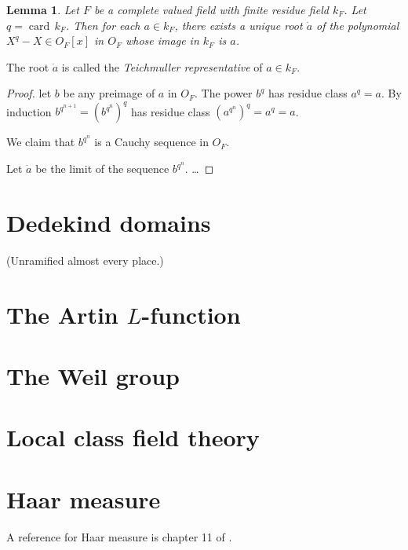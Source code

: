 \documentclass{amsart}
\def\op#1{{\operatorname{#1}}}
\newtheorem{lemma}[equation]{Lemma}
\def\newterm#1{{\it #1}}
\def\card#1{\op{card}{#1}}
\begin{document}
\begin{lemma}  Let $F$ be a complete valued field with finite residue field $k_F$.
Let $q = \card\,k_F$.  Then for each $a\in k_F$, there exists a unique root $\dot a$ of
the polynomial $X^q-X\in O_F[x]$ in $O_F$ whose image in $k_F$ is $a$.
\end{lemma}

The root $\dot a$ is called the \newterm{Teichmuller representative} of $a\in k_F$.

\begin{proof} let $b$ be any preimage of $a$ in $O_F$.  The power $b^q$ has residue class
 $a^q=a$.  By induction $b^{q^{n+1}}=(b^{q^n})^q$ has residue class $(a^{q^n})^q = a^q = a$.

We claim that $b^{q^n}$ is a Cauchy sequence in $O_F$.

Let $\dot a$ be the limit of the sequence $b^{q^n}$.  
\dots
\end{proof}

\newpage

\section{Dedekind domains}



(Unramified almost every place.)

\section{The Artin $L$-function}





\section{The Weil group}


\section{Local class field theory}

\section{Haar measure}

A reference for Haar measure is chapter 11 of \cite{Halmos-measure}.



\raggedright


\end{document}
